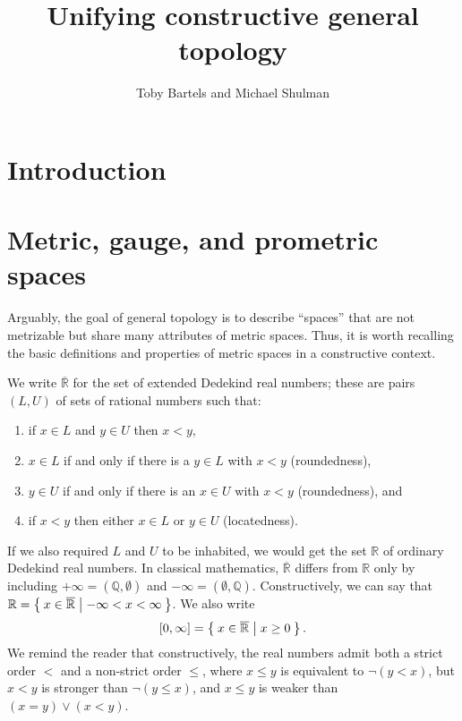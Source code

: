 \documentclass{article}
\title{Unifying constructive general topology}
\author{Toby Bartels and Michael Shulman}
\def\R{\mathbb{R}}
\def\Re{\overline{\mathbb{R}}}
\def\Rp{[0,\infty]}
\begin{document}
\maketitle

\section{Introduction}
\label{sec:intro}

\section{Metric, gauge, and prometric spaces}
\label{sec:metric}

Arguably, the goal of general topology is to describe ``spaces'' that are not metrizable but share many attributes of metric spaces.
Thus, it is worth recalling the basic definitions and properties of metric spaces in a constructive context.

We write $\Re$ for the set of extended Dedekind real numbers; these are pairs $(L,U)$ of sets of rational numbers such that:
\begin{enumerate}
\item if $x\in L$ and $y\in U$ then $x<y$,
\item $x\in L$ if and only if there is a $y\in L$ with $x<y$ (roundedness),
\item $y\in U$ if and only if there is an $x\in U$ with $x<y$ (roundedness), and
\item if $x<y$ then either $x\in L$ or $y\in U$ (locatedness).
\end{enumerate}
If we also required $L$ and $U$ to be inhabited, we would get the set $\R$ of ordinary Dedekind real numbers.
In classical mathematics, $\Re$ differs from $\R$ only by including $+\infty = (\mathbb{Q},\emptyset)$ and $-\infty = (\emptyset,\mathbb{Q})$.
Constructively, we can say that $\R = \setof{ x\in \Re | -\infty < x < \infty }$.
We also write
\[\Rp = \setof{x\in\Re | x\ge 0 }.\]
We remind the reader that constructively, the real numbers admit both a strict order $<$ and a non-strict order $\le$, where $x\le y$ is equivalent to $\neg(y<x)$, but $x<y$ is stronger than $\neg(y\le x)$, and $x\le y$ is weaker than $(x=y)\lor (x<y)$.
\end{document}
